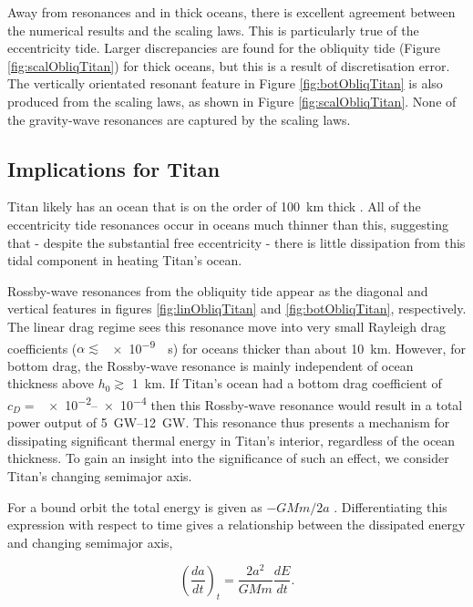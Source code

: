 Away from resonances and in thick oceans, there is excellent agreement between the numerical results and the scaling laws. This is particularly true of the eccentricity tide. Larger discrepancies are found for the obliquity tide (Figure \ref{fig:scalObliqTitan}) for thick oceans, but this is a result of discretisation error. The vertically orientated resonant feature in Figure \ref{fig:botObliqTitan} is also produced from the scaling laws, as shown in Figure \ref{fig:scalObliqTitan}. None of the gravity-wave resonances are captured by the scaling laws. 

\subsection{Implications for Titan}

Titan likely has an ocean that is on the order of \SI{100}{\kilo\metre} thick \citep{sohl2014structural,baland2014titan}. All of the eccentricity tide resonances occur in oceans much thinner than this, suggesting that - despite the substantial free eccentricity - there is little dissipation from this tidal component in heating Titan's ocean.

Rossby-wave resonances from the obliquity tide appear as the diagonal and vertical features in figures \ref{fig:linObliqTitan} and \ref{fig:botObliqTitan}, respectively. The linear drag regime sees this resonance move into very small Rayleigh drag coefficients ($\alpha \lesssim$ \SI{e-9}{\per\second}) for oceans thicker than about \SI{10}{\kilo\metre}. However, for bottom drag, the Rossby-wave resonance is mainly independent of ocean thickness above $h_0 \gtrsim$ \SI{1}{\kilo\metre}. If Titan's ocean had a bottom drag coefficient of $c_D =$ \numrange{e-2}{e-4} then this Rossby-wave resonance would result in a total power output of \SIrange{5}{12}{\giga\watt}. This resonance thus presents a mechanism for dissipating significant thermal energy in Titan's interior, regardless of the ocean thickness. To gain an insight into the significance of such an effect, we consider Titan's changing semimajor axis.

For a bound orbit the total energy is given as $-GMm/2a$ \citep{murray1999solar}. Differentiating this expression with respect to time gives a relationship between the dissipated energy and changing semimajor axis,

\begin{equation}
\left( \dfrac{da}{dt} \right)_t = \dfrac{2a^2}{GM m}\dfrac{dE}{dt}.
\label{eq:adot_t}
\end{equation}

